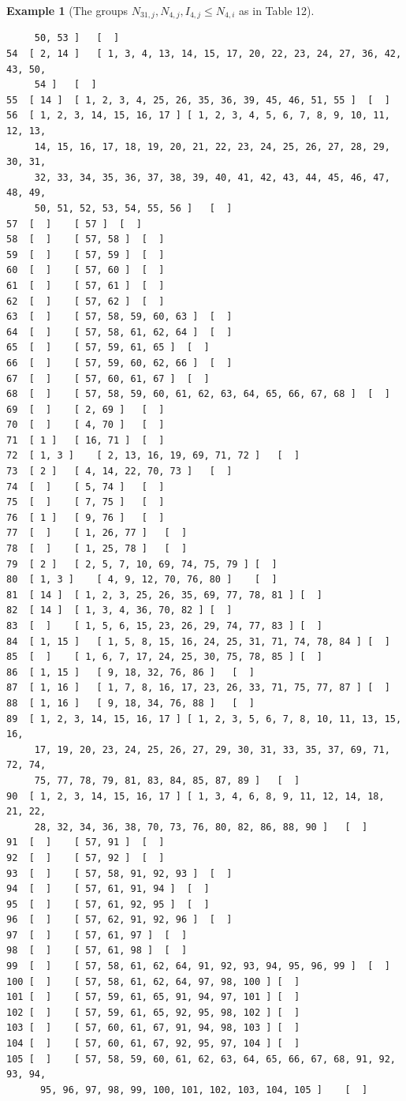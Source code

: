 \documentclass{amsart}
\theoremstyle{plain}
\theoremstyle{definition}
\newtheorem{example}[theorem]{Example}
\theoremstyle{remark}
\begin{document}
\begin{example}[The groups $N_{31,j}, N_{4,j}, I_{4,j}\leq N_{4,i}$ as in Table 12]
\begin{verbatim}
     50, 53 ]	[  ]
54	[ 2, 14 ]	[ 1, 3, 4, 13, 14, 15, 17, 20, 22, 23, 24, 27, 36, 42, 43, 50, 
     54 ]	[  ]
55	[ 14 ]	[ 1, 2, 3, 4, 25, 26, 35, 36, 39, 45, 46, 51, 55 ]	[  ]
56	[ 1, 2, 3, 14, 15, 16, 17 ]	[ 1, 2, 3, 4, 5, 6, 7, 8, 9, 10, 11, 12, 13, 
     14, 15, 16, 17, 18, 19, 20, 21, 22, 23, 24, 25, 26, 27, 28, 29, 30, 31, 
     32, 33, 34, 35, 36, 37, 38, 39, 40, 41, 42, 43, 44, 45, 46, 47, 48, 49, 
     50, 51, 52, 53, 54, 55, 56 ]	[  ]
57	[  ]	[ 57 ]	[  ]
58	[  ]	[ 57, 58 ]	[  ]
59	[  ]	[ 57, 59 ]	[  ]
60	[  ]	[ 57, 60 ]	[  ]
61	[  ]	[ 57, 61 ]	[  ]
62	[  ]	[ 57, 62 ]	[  ]
63	[  ]	[ 57, 58, 59, 60, 63 ]	[  ]
64	[  ]	[ 57, 58, 61, 62, 64 ]	[  ]
65	[  ]	[ 57, 59, 61, 65 ]	[  ]
66	[  ]	[ 57, 59, 60, 62, 66 ]	[  ]
67	[  ]	[ 57, 60, 61, 67 ]	[  ]
68	[  ]	[ 57, 58, 59, 60, 61, 62, 63, 64, 65, 66, 67, 68 ]	[  ]
69	[  ]	[ 2, 69 ]	[  ]
70	[  ]	[ 4, 70 ]	[  ]
71	[ 1 ]	[ 16, 71 ]	[  ]
72	[ 1, 3 ]	[ 2, 13, 16, 19, 69, 71, 72 ]	[  ]
73	[ 2 ]	[ 4, 14, 22, 70, 73 ]	[  ]
74	[  ]	[ 5, 74 ]	[  ]
75	[  ]	[ 7, 75 ]	[  ]
76	[ 1 ]	[ 9, 76 ]	[  ]
77	[  ]	[ 1, 26, 77 ]	[  ]
78	[  ]	[ 1, 25, 78 ]	[  ]
79	[ 2 ]	[ 2, 5, 7, 10, 69, 74, 75, 79 ]	[  ]
80	[ 1, 3 ]	[ 4, 9, 12, 70, 76, 80 ]	[  ]
81	[ 14 ]	[ 1, 2, 3, 25, 26, 35, 69, 77, 78, 81 ]	[  ]
82	[ 14 ]	[ 1, 3, 4, 36, 70, 82 ]	[  ]
83	[  ]	[ 1, 5, 6, 15, 23, 26, 29, 74, 77, 83 ]	[  ]
84	[ 1, 15 ]	[ 1, 5, 8, 15, 16, 24, 25, 31, 71, 74, 78, 84 ]	[  ]
85	[  ]	[ 1, 6, 7, 17, 24, 25, 30, 75, 78, 85 ]	[  ]
86	[ 1, 15 ]	[ 9, 18, 32, 76, 86 ]	[  ]
87	[ 1, 16 ]	[ 1, 7, 8, 16, 17, 23, 26, 33, 71, 75, 77, 87 ]	[  ]
88	[ 1, 16 ]	[ 9, 18, 34, 76, 88 ]	[  ]
89	[ 1, 2, 3, 14, 15, 16, 17 ]	[ 1, 2, 3, 5, 6, 7, 8, 10, 11, 13, 15, 16, 
     17, 19, 20, 23, 24, 25, 26, 27, 29, 30, 31, 33, 35, 37, 69, 71, 72, 74, 
     75, 77, 78, 79, 81, 83, 84, 85, 87, 89 ]	[  ]
90	[ 1, 2, 3, 14, 15, 16, 17 ]	[ 1, 3, 4, 6, 8, 9, 11, 12, 14, 18, 21, 22, 
     28, 32, 34, 36, 38, 70, 73, 76, 80, 82, 86, 88, 90 ]	[  ]
91	[  ]	[ 57, 91 ]	[  ]
92	[  ]	[ 57, 92 ]	[  ]
93	[  ]	[ 57, 58, 91, 92, 93 ]	[  ]
94	[  ]	[ 57, 61, 91, 94 ]	[  ]
95	[  ]	[ 57, 61, 92, 95 ]	[  ]
96	[  ]	[ 57, 62, 91, 92, 96 ]	[  ]
97	[  ]	[ 57, 61, 97 ]	[  ]
98	[  ]	[ 57, 61, 98 ]	[  ]
99	[  ]	[ 57, 58, 61, 62, 64, 91, 92, 93, 94, 95, 96, 99 ]	[  ]
100	[  ]	[ 57, 58, 61, 62, 64, 97, 98, 100 ]	[  ]
101	[  ]	[ 57, 59, 61, 65, 91, 94, 97, 101 ]	[  ]
102	[  ]	[ 57, 59, 61, 65, 92, 95, 98, 102 ]	[  ]
103	[  ]	[ 57, 60, 61, 67, 91, 94, 98, 103 ]	[  ]
104	[  ]	[ 57, 60, 61, 67, 92, 95, 97, 104 ]	[  ]
105	[  ]	[ 57, 58, 59, 60, 61, 62, 63, 64, 65, 66, 67, 68, 91, 92, 93, 94, 
      95, 96, 97, 98, 99, 100, 101, 102, 103, 104, 105 ]	[  ]

\end{verbatim}
\end{example}
\end{document}
